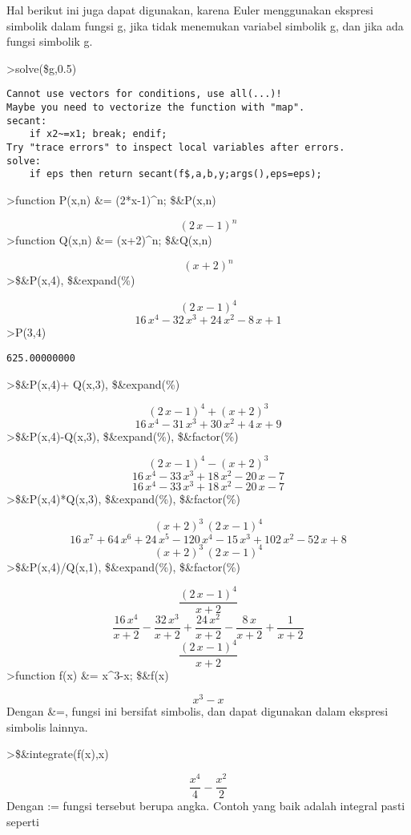 \documentclass[
]{book}
\begin{document}
Hal berikut ini juga dapat digunakan, karena Euler menggunakan ekspresi simbolik dalam fungsi g, jika tidak menemukan variabel simbolik g, dan jika ada fungsi simbolik g.

\textgreater solve(\$g,0.5)

\begin{verbatim}
Cannot use vectors for conditions, use all(...)!
Maybe you need to vectorize the function with "map".
secant:
    if x2~=x1; break; endif;
Try "trace errors" to inspect local variables after errors.
solve:
    if eps then return secant(f$,a,b,y;args(),eps=eps);
\end{verbatim}

\textgreater function P(x,n) \&= (2*x-1)\^{}n; \$\&P(x,n)

\[\left(2\,x-1\right)^{n}\]\textgreater function Q(x,n) \&= (x+2)\^{}n; \$\&Q(x,n)

\[\left(x+2\right)^{n}\]\textgreater\$\&P(x,4), \$\&expand(\%)

\[\left(2\,x-1\right)^4\]\[16\,x^4-32\,x^3+24\,x^2-8\,x+1\]\textgreater P(3,4)

\begin{verbatim}
625.00000000 
\end{verbatim}

\textgreater\$\&P(x,4)+ Q(x,3), \$\&expand(\%)

\[\left(2\,x-1\right)^4+\left(x+2\right)^3\]\[16\,x^4-31\,x^3+30\,x^2+4\,x+9\]\textgreater\$\&P(x,4)-Q(x,3), \$\&expand(\%), \$\&factor(\%)

\[\left(2\,x-1\right)^4-\left(x+2\right)^3\]\[16\,x^4-33\,x^3+18\,x^2-20\,x-7\]\[16\,x^4-33\,x^3+18\,x^2-20\,x-7\]\textgreater\$\&P(x,4)*Q(x,3), \$\&expand(\%), \$\&factor(\%)

\[\left(x+2\right)^3\,\left(2\,x-1\right)^4\]\[16\,x^7+64\,x^6+24\,x^5-120\,x^4-15\,x^3+102\,x^2-52\,x+8\]\[\left(x+2\right)^3\,\left(2\,x-1\right)^4\]\textgreater\$\&P(x,4)/Q(x,1), \$\&expand(\%), \$\&factor(\%)

\[\frac{\left(2\,x-1\right)^4}{x+2}\]\[\frac{16\,x^4}{x+2}-\frac{32\,x^3}{x+2}+\frac{24\,x^2}{x+2}-\frac{8
 \,x}{x+2}+\frac{1}{x+2}\]\[\frac{\left(2\,x-1\right)^4}{x+2}\]\textgreater function f(x) \&= x\^{}3-x; \$\&f(x)

\[x^3-x\]Dengan \&=, fungsi ini bersifat simbolis, dan dapat digunakan dalam ekspresi simbolis lainnya.

\textgreater\$\&integrate(f(x),x)

\[\frac{x^4}{4}-\frac{x^2}{2}\]Dengan := fungsi tersebut berupa angka. Contoh yang baik adalah integral pasti seperti
\end{document}
